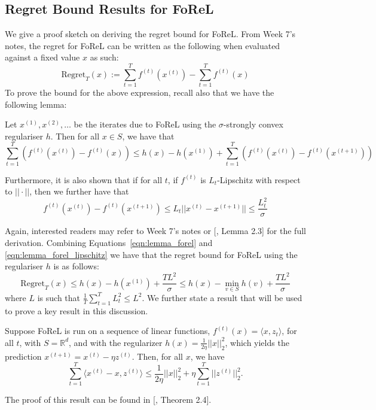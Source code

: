 \subsection{Regret Bound Results for FoReL}
We give a proof sketch on deriving the regret bound for FoReL. From Week 7's notes, the regret for FoReL can be written as the following when evaluated against a fixed value $x$ as such:
\begin{equation}\label{eqn:regret_forel}
    \text{Regret}_T(x) := \sum_{t=1}^T f^{(t)}(x^{(t)}) - \sum_{t=1}^T f^{(t)}(x)
\end{equation}
To prove the bound for the above expression, recall also that we have the following lemma:
\begin{lemma}\label{lemma:iterates_forel}
    Let $x^{(1)}, x^{(2)}, \ldots$ be the iterates due to FoReL using the $\sigma$-strongly convex regulariser $h$. Then for all $x \in S$, we have that \begin{equation}\label{eqn:lemma_forel}
        \sum_{t=1}^T (f^{(t)}(x^{(t)}) - f^{(t)}(x)) \leq h(x) - h(x^{(1)}) + \sum_{t=1}^T (f^{(t)}(x^{(t)}) - f^{(t)}(x^{(t+1)}))
    \end{equation}
\end{lemma}
\noindent Furthermore, it is also shown that if for all $t$, if $f^{(t)}$ is $L_t$-Lipschitz with respect to $||\cdot||$, then we further have that 
\begin{equation}\label{eqn:lemma_forel_lipschitz}
    f^{(t)}(x^{(t)}) - f^{(t)}(x^{(t+1)}) \leq L_t ||x^{(t)} - x^{(t+1)}|| \leq \frac{L_t^2}{\sigma}
\end{equation} 

\noindent Again, interested readers may refer to Week 7's notes or [\cite{shalev2025online}, Lemma 2.3] for the full derivation. Combining Equations~\ref{eqn:lemma_forel} and \ref{eqn:lemma_forel_lipschitz} we have that the regret bound for FoReL using the regulariser $h$ is as follows:
\begin{equation}\label{eqn:forel_regre_with_min}
    \text{Regret}_T(x) \leq h(x) - h(x^{(1)}) + \frac{TL^2}{\sigma} \leq h(x) - \min_{v \in S} h(v) + \frac{TL^2}{\sigma}
\end{equation} where $L$ is such that $\frac{1}{T}\sum_{t=1}^T L_t^2 \leq L^2$. We further state a result that will be used to prove a key result in this discussion.
\begin{lemma}\label{lemma:forel_generic_bound}
    Suppose FoReL is run on a sequence of linear functions, $f^{(t)}(x) = \langle x, z_t\rangle$, for all $t$, with $S = \mathbb{R}^d$, and with the regularizer $h(x) = \frac{1}{2\eta}||x||_2^2$, which yields the prediction $x^{(t+1)} = x^{(t)} - \eta z^{(t)}$. Then, for all $x$, we have
    \begin{equation}
        \sum_{t=1}^T \langle x^{(t)} - x, z^{(t)} \rangle \leq \frac{1}{2\eta} ||x||_2^2 + \eta \sum_{t=1}^T ||z^{(t)}||_2^2.
    \end{equation}
\end{lemma}
\noindent The proof of this result can be found in [\cite{shalev2025online}, Theorem 2.4].

